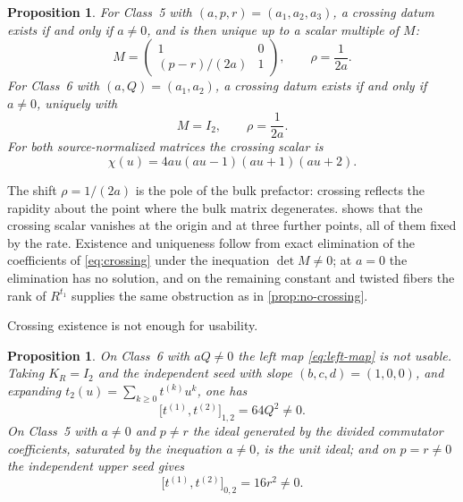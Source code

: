 \documentclass[11pt,reqno]{amsart}
\theoremstyle{plain}
\newtheorem{proposition}[theorem]{Proposition}
\theoremstyle{definition}
\theoremstyle{remark}
\numberwithin{equation}{section}
\newcommand{\Id}{I_2}
\begin{document}
\begin{proposition}
\label{prop:crossing-56}
For Class~5 with $(a,p,r)=(a_1,a_2,a_3)$, a crossing datum exists if and only if
$a\ne0$, and is then unique up to a scalar multiple of $M$:
\begin{equation}
M=\begin{pmatrix}1&0\\(p-r)/(2a)&1\end{pmatrix},\qquad
\rho=\frac1{2a}.                                    \label{eq:C5-crossing}
\end{equation}
For Class~6 with $(a,Q)=(a_1,a_2)$, a crossing datum exists if and only if
$a\ne0$, uniquely with
\begin{equation}
M=\Id,\qquad \rho=\frac1{2a}.                       \label{eq:C6-crossing}
\end{equation}
For both source-normalized matrices the crossing scalar is
\begin{equation}
\chi(u)=4au(au-1)(au+1)(au+2).                     \label{eq:chi}
\end{equation}
\end{proposition}

The shift $\rho=1/(2a)$ is the pole of the bulk prefactor: crossing reflects the
rapidity about the point where the bulk matrix degenerates.  shows
that the crossing scalar vanishes at the origin and at three further points, all
of them fixed by the rate. Existence and uniqueness follow from exact elimination
of the coefficients of \cref{eq:crossing} under the inequation $\det M\ne0$; at
$a=0$ the elimination has no solution, and on the remaining constant and twisted
fibers the rank of $R^{t_1}$ supplies the same obstruction as in
\cref{prop:no-crossing}.

Crossing existence is not enough for usability.

\begin{proposition}
\label{prop:not-usable}
On Class~6 with $aQ\ne0$ the left map \cref{eq:left-map} is not usable. Taking
$K_R=\Id$ and the independent seed with slope $(b,c,d)=(1,0,0)$, and expanding
$t_2(u)=\sum_{k\ge0}t^{(k)}u^k$, one has
\begin{equation}
\bigl[t^{(1)},t^{(2)}\bigr]_{1,2}=64Q^2\ne0.        \label{eq:C6-no-go}
\end{equation}
On Class~5 with $a\ne0$ and $p\ne r$ the ideal generated by the divided
commutator coefficients, saturated by the inequation $a\ne0$, is the unit ideal;
and on $p=r\ne0$ the independent upper seed gives
\begin{equation}
\bigl[t^{(1)},t^{(2)}\bigr]_{0,2}=16r^2\ne0.        \label{eq:C5-no-go}
\end{equation}
\end{proposition}
\end{document}
